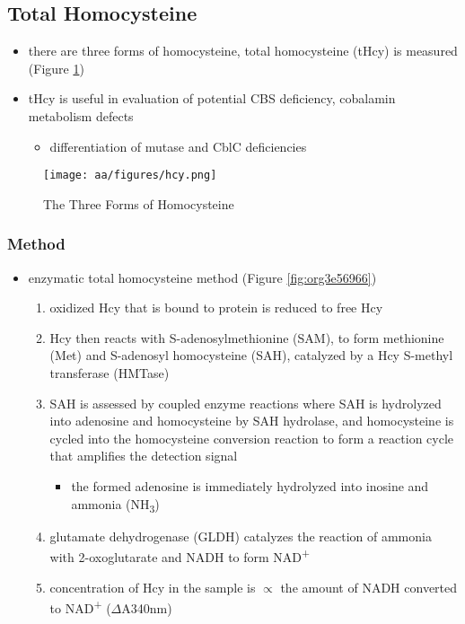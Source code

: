 \documentclass[12pt]{scrartcl}
\begin{document}
\subsection{Total Homocysteine}
\label{sec:org0eda6a3}
\begin{itemize}
\item there are three forms of homocysteine, total homocysteine (tHcy) is
measured (Figure \ref{fig:orgfa9c23e})
\item tHcy is useful in evaluation of potential CBS deficiency, cobalamin
metabolism defects
\begin{itemize}
\item differentiation of mutase and CblC deficiencies
\end{itemize}
\end{itemize}


\begin{figure}[htbp]
\centering
\texttt{[image: aa/figures/hcy.png]}
\caption{\label{fig:orgfa9c23e}The Three Forms of Homocysteine}
\end{figure}

\subsubsection{Method}
\label{sec:org47e7188}
\begin{itemize}
\item enzymatic total homocysteine method (Figure \ref{fig:org3e56966})
\begin{enumerate}
\item oxidized Hcy that is bound to protein is reduced to free Hcy
\item Hcy then reacts with S-adenosylmethionine (SAM), to form methionine
(Met) and S-adenosyl homocysteine (SAH), catalyzed by a Hcy
S-methyl transferase (HMTase)
\item SAH is assessed by coupled enzyme reactions where SAH is hydrolyzed
into adenosine and homocysteine by SAH hydrolase, and homocysteine
is cycled into the homocysteine conversion reaction to form a
reaction cycle that amplifies the detection signal
\begin{itemize}
\item the formed adenosine is immediately hydrolyzed into inosine and
ammonia (NH\textsubscript{3})
\end{itemize}
\item glutamate dehydrogenase (GLDH) catalyzes the reaction of ammonia
with 2-oxoglutarate and NADH to form NAD\textsuperscript{+}
\item concentration of Hcy in the sample is \(\propto\) the amount of NADH
converted to NAD\textsuperscript{+} (\(\Delta\)A340nm)
\end{enumerate}
\end{itemize}
\end{document}
